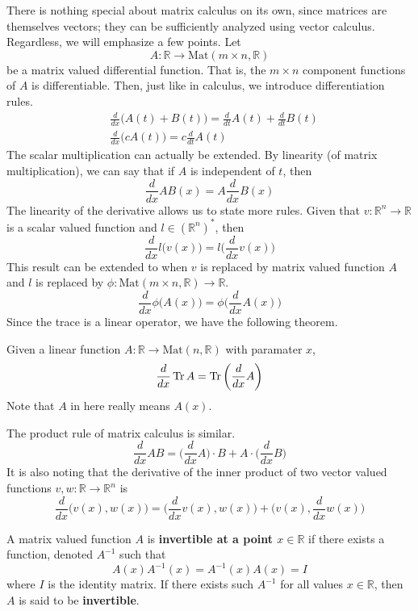   There is nothing special about matrix calculus on its own, since matrices are themselves vectors; they can be sufficiently analyzed using vector calculus. Regardless, we will emphasize a few points. Let
  \[A: \mathbb{R} \longrightarrow \text{Mat}(m \times n, \mathbb{R})\]
  be a matrix valued differential function. That is, the $m \times n$ component functions of $A$ is differentiable. Then, just like in calculus, we introduce differentiation rules.
  \begin{align*}
      & \frac{d}{d x} \big( A(t) + B(t)\big) = \frac{d}{d t} A(t) + \frac{d}{d t} B(t) \\
      & \frac{d}{d x} \big( c A(t)\big) = c \frac{d}{d t} A(t)
  \end{align*}
  The scalar multiplication can actually be extended. By linearity (of matrix multiplication), we can say that if $A$ is independent of $t$, then 
  \[\frac{d}{d x} A B (x) = A \frac{d}{d x} B(x)\]
  The linearity of the derivative allows us to state more rules. Given that $v: \mathbb{R}^n \longrightarrow \mathbb{R}$ is a scalar valued function and $l \in (\mathbb{R}^n)^*$, then  
  \[\frac{d}{d x} l \big( v(x) \big) = l \bigg( \frac{d}{d x} v(x) \bigg)\]
  This result can be extended to when $v$ is replaced by matrix valued function $A$ and $l$ is replaced by $\phi: \text{Mat}(m \times n, \mathbb{R}) \longrightarrow \mathbb{R}$. 
  \[\frac{d}{d x} \phi \big( A(x) \big) = \phi \bigg( \frac{d}{d x} A(x) \bigg)\]
  Since the trace is a linear operator, we have the following theorem. 

  \begin{theorem}
  Given a linear function $A: \mathbb{R} \longrightarrow \text{Mat}(n, \mathbb{R})$ with paramater $x$, 
  \[\frac{d}{d x} \operatorname{Tr}{A} = \operatorname{Tr} \bigg( \frac{d}{d x} A \bigg)\]
  Note that $A$ in here really means $A(x)$.
  \end{theorem}

  The product rule of matrix calculus is similar.
  \[\frac{d}{d x} A B = \bigg(\frac{d}{d x} A\bigg) \cdot B + A \cdot \bigg(\frac{d}{d x} B \bigg)\]
  It is also noting that the derivative of the inner product of two vector valued functions $v, w: \mathbb{R} \longrightarrow \mathbb{R}^n$ is 
  \[\frac{d}{d x} \big( v(x), w(x) \big) = \Big( \frac{d}{d x} v(x), w(x) \Big) + \Big( v(x), \frac{d}{d x} w(x) \Big)\]

  \begin{definition}
  A matrix valued function $A$ is \textbf{invertible at a point $x \in \mathbb{R}$} if there exists a function, denoted $A^{-1}$ such that
  \[A(x) A^{-1} (x) = A^{-1}(x) A(x) = I\]
  where $I$ is the identity matrix. If there exists such $A^{-1}$ for all values $x \in \mathbb{R}$, then $A$ is said to be \textbf{invertible}. 
  \end{definition}

